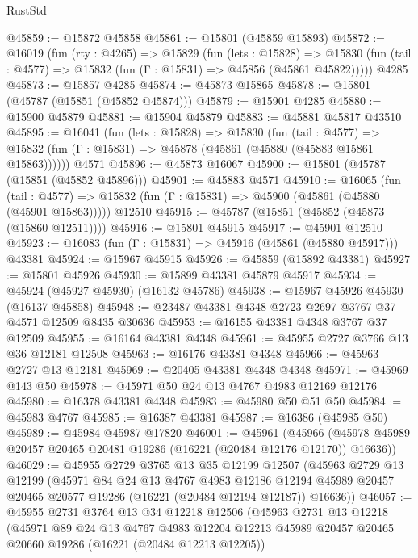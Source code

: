 \begin{lexlean}{RustStd}
\begin{coremodule}
@45859 := @15872 @45858
@45861 := @15801 (@45859 @15893)
@45872 := @16019
    (fun (rty : @4265) =>
    @15829
      (fun (lets : @15828) =>
      @15830 (fun (tail : @4577) => @15832 (fun (Γ : @15831) => @45856 (@45861 @45822)))))
    @4285
@45873 := @15857 @4285
@45874 := @45873 @15865
@45878 := @15801 (@45787 (@15851 (@45852 @45874)))
@45879 := @15901 @4285
@45880 := @15900 @45879
@45881 := @15904 @45879
@45883 := @45881 @45817 @43510
@45895 := @16041
    (fun (lets : @15828) =>
    @15830
      (fun (tail : @4577) =>
      @15832 (fun (Γ : @15831) => @45878 (@45861 (@45880 (@45883 @15861 @15863))))))
    @4571
@45896 := @45873 @16067
@45900 := @15801 (@45787 (@15851 (@45852 @45896)))
@45901 := @45883 @4571
@45910 := @16065
    (fun (tail : @4577) => @15832 (fun (Γ : @15831) => @45900 (@45861 (@45880 (@45901 @15863)))))
    @12510
@45915 := @45787 (@15851 (@45852 (@45873 (@15860 @12511))))
@45916 := @15801 @45915
@45917 := @45901 @12510
@45923 := @16083 (fun (Γ : @15831) => @45916 (@45861 (@45880 @45917))) @43381
@45924 := @15967 @45915
@45926 := @45859 (@15892 @43381)
@45927 := @15801 @45926
@45930 := @15899 @43381 @45879 @45917
@45934 := @45924 (@45927 @45930) (@16132 @45786)
@45938 := @15967 @45926 @45930 (@16137 @45858)
@45948 := @23487 @43381 @4348 @2723 @2697 @3767 @37 @4571 @12509 @8435 @30636
@45953 := @16155 @43381 @4348 @3767 @37 @12509
@45955 := @16164 @43381 @4348
@45961 := @45955 @2727 @3766 @13 @36 @12181 @12508
@45963 := @16176 @43381 @4348
@45966 := @45963 @2727 @13 @12181
@45969 := @20405 @43381 @4348 @4348
@45971 := @45969 @143 @50
@45978 := @45971 @50 @24 @13 @4767 @4983 @12169 @12176
@45980 := @16378 @43381 @4348
@45983 := @45980 @50 @51 @50
@45984 := @45983 @4767
@45985 := @16387 @43381
@45987 := @16386 (@45985 @50)
@45989 := @45984 @45987 @17820
@46001 := @45961
    (@45966 (@45978 @45989 @20457 @20465 @20481 @19286 (@16221 (@20484 @12176 @12170)) @16636))
@46029 := @45955
    @2729
    @3765
    @13
    @35
    @12199
    @12507
    (@45963
      @2729
      @13
      @12199
      (@45971
        @84
        @24
        @13
        @4767
        @4983
        @12186
        @12194
        @45989
        @20457
        @20465
        @20577
        @19286
        (@16221 (@20484 @12194 @12187))
        @16636))
@46057 := @45955
    @2731
    @3764
    @13
    @34
    @12218
    @12506
    (@45963
      @2731
      @13
      @12218
      (@45971
        @89
        @24
        @13
        @4767
        @4983
        @12204
        @12213
        @45989
        @20457
        @20465
        @20660
        @19286
        (@16221 (@20484 @12213 @12205))

\end{coremodule}
\end{lexlean}
